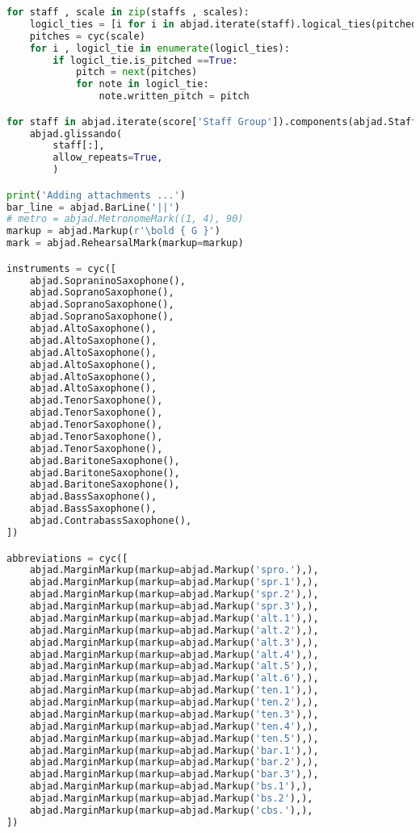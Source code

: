 \begin{lstlisting}[language=Python, caption=Invocation Source Code]
for staff , scale in zip(staffs , scales):
    logicl_ties = [i for i in abjad.iterate(staff).logical_ties(pitched=True)]
    pitches = cyc(scale)
    for i , logicl_tie in enumerate(logicl_ties):
        if logicl_tie.is_pitched ==True:
            pitch = next(pitches)
            for note in logicl_tie:
                note.written_pitch = pitch

for staff in abjad.iterate(score['Staff Group']).components(abjad.Staff):
    abjad.glissando(
        staff[:],
        allow_repeats=True,
        )

print('Adding attachments ...')
bar_line = abjad.BarLine('||')
# metro = abjad.MetronomeMark((1, 4), 90)
markup = abjad.Markup(r'\bold { G }')
mark = abjad.RehearsalMark(markup=markup)

instruments = cyc([
    abjad.SopraninoSaxophone(),
    abjad.SopranoSaxophone(),
    abjad.SopranoSaxophone(),
    abjad.SopranoSaxophone(),
    abjad.AltoSaxophone(),
    abjad.AltoSaxophone(),
    abjad.AltoSaxophone(),
    abjad.AltoSaxophone(),
    abjad.AltoSaxophone(),
    abjad.AltoSaxophone(),
    abjad.TenorSaxophone(),
    abjad.TenorSaxophone(),
    abjad.TenorSaxophone(),
    abjad.TenorSaxophone(),
    abjad.TenorSaxophone(),
    abjad.BaritoneSaxophone(),
    abjad.BaritoneSaxophone(),
    abjad.BaritoneSaxophone(),
    abjad.BassSaxophone(),
    abjad.BassSaxophone(),
    abjad.ContrabassSaxophone(),
])

abbreviations = cyc([
    abjad.MarginMarkup(markup=abjad.Markup('spro.'),),
    abjad.MarginMarkup(markup=abjad.Markup('spr.1'),),
    abjad.MarginMarkup(markup=abjad.Markup('spr.2'),),
    abjad.MarginMarkup(markup=abjad.Markup('spr.3'),),
    abjad.MarginMarkup(markup=abjad.Markup('alt.1'),),
    abjad.MarginMarkup(markup=abjad.Markup('alt.2'),),
    abjad.MarginMarkup(markup=abjad.Markup('alt.3'),),
    abjad.MarginMarkup(markup=abjad.Markup('alt.4'),),
    abjad.MarginMarkup(markup=abjad.Markup('alt.5'),),
    abjad.MarginMarkup(markup=abjad.Markup('alt.6'),),
    abjad.MarginMarkup(markup=abjad.Markup('ten.1'),),
    abjad.MarginMarkup(markup=abjad.Markup('ten.2'),),
    abjad.MarginMarkup(markup=abjad.Markup('ten.3'),),
    abjad.MarginMarkup(markup=abjad.Markup('ten.4'),),
    abjad.MarginMarkup(markup=abjad.Markup('ten.5'),),
    abjad.MarginMarkup(markup=abjad.Markup('bar.1'),),
    abjad.MarginMarkup(markup=abjad.Markup('bar.2'),),
    abjad.MarginMarkup(markup=abjad.Markup('bar.3'),),
    abjad.MarginMarkup(markup=abjad.Markup('bs.1'),),
    abjad.MarginMarkup(markup=abjad.Markup('bs.2'),),
    abjad.MarginMarkup(markup=abjad.Markup('cbs.'),),
])


\end{lstlisting}
